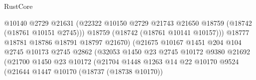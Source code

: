 \begin{lexlean}{RustCore}
\begin{coremodule}
                                              @10140
                                              @2729
                                              @21631
                                              (@22322
                                                @10150
                                                @2729
                                                @21743
                                                @21650
                                                @18759
                                                (@18742 (@18761 @10151 @2745)))
                                              @18759
                                              (@18742 (@18761 @10141 @10157)))
                                            @18777
                                            @18781
                                            @18786
                                            @18791
                                            @18797
                                            @21670)
                                          (@21675
                                            @10167
                                            @1451
                                            @204
                                            @104
                                            @2745
                                            @10173
                                            @2745
                                            @2862
                                            (@32053
                                              @1450
                                              @23
                                              @2745
                                              @10172
                                              @9380
                                              @21692
                                              (@21700
                                                @1450
                                                @23
                                                @10172
                                                (@21704
                                                  @1448
                                                  @1263
                                                  @14
                                                  @22
                                                  @10170
                                                  @9524
                                                  (@21644
                                                    @1447
                                                    @10170
                                                    (@18737 (@18738 @10170))

\end{coremodule}
\end{lexlean}

